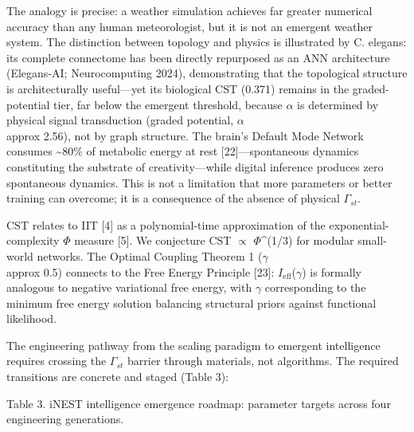 \documentclass[a4paper,12pt]{article}
\begin{document}
The analogy is precise: a weather simulation achieves far greater numerical accuracy than any human meteorologist, but it is not an emergent weather system. The distinction between topology and physics is illustrated by C. elegans: its complete connectome has been directly repurposed as an ANN architecture (Elegans-AI; Neurocomputing 2024), demonstrating that the topological structure is architecturally useful---yet its biological CST (0.371) remains in the graded-potential tier, far below the emergent threshold, because $\alpha$ is determined by physical signal transduction (graded potential, $\alpha$  \\approx  2.56), not by graph structure. The brain's Default Mode Network consumes \textasciitilde{}80\% of metabolic energy at rest [22]---spontaneous dynamics constituting the substrate of creativity---while digital inference produces zero spontaneous dynamics. This is not a limitation that more parameters or better training can overcome; it is a consequence of the absence of physical $\Gamma_{st}$.


CST relates to IIT [4] as a polynomial-time approximation of the exponential-complexity $\Phi$ measure [5]. We conjecture CST $\propto$ $\Phi$^(1/3) for modular small-world networks. The Optimal Coupling Theorem 1 ($\gamma$  \\approx  0.5) connects to the Free Energy Principle [23]: $I_{\text{eff}}$($\gamma$) is formally analogous to negative variational free energy, with $\gamma$ corresponding to the minimum free energy solution balancing structural priors against functional likelihood.


The engineering pathway from the scaling paradigm to emergent intelligence requires crossing the $\Gamma_{st}$ barrier through materials, not algorithms. The required transitions are concrete and staged (Table 3):


Table 3. iNEST intelligence emergence roadmap: parameter targets across four engineering generations.
\end{document}
